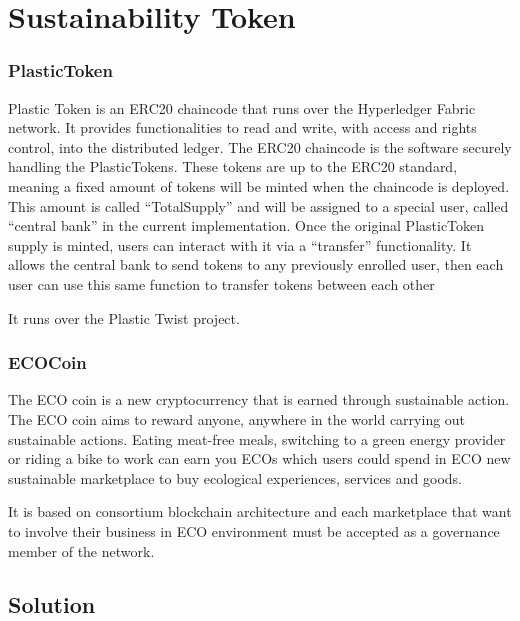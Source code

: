 \section{Sustainability Token}

\subsubsection{PlasticToken}

Plastic Token is an ERC20 chaincode that runs over the Hyperledger Fabric network\cite{plastic-coin}. It provides functionalities to read
and write, with access and rights control, into the distributed ledger. The ERC20 chaincode is the software 
securely handling the PlasticTokens. These tokens are up to the ERC20 standard, meaning a fixed 
amount of tokens will be minted when the chaincode is deployed. This amount is called “TotalSupply” and 
will be assigned to a special user, called “central bank” in the current implementation.
Once the original PlasticToken\cite{ptwist} supply is minted, users can interact with it via a “transfer” functionality. It
allows the central bank to send tokens to any previously enrolled user, then each user can use this same
function to transfer tokens between each other

It runs over the Plastic Twist project. 

\subsubsection{ECOCoin}

The ECO coin\cite{eco-coin} is a new cryptocurrency that is earned through sustainable action. The ECO coin
aims to reward anyone, anywhere in the world carrying out sustainable actions. Eating meat-free
meals, switching to a green energy provider or riding a bike to work can earn you ECOs which
users could spend in ECO new sustainable marketplace to buy ecological experiences, services and
goods. 

It is based on consortium blockchain architecture and each marketplace that want to involve their 
business in ECO environment must be accepted as a governance member of the network. 

\subsection{Solution}

